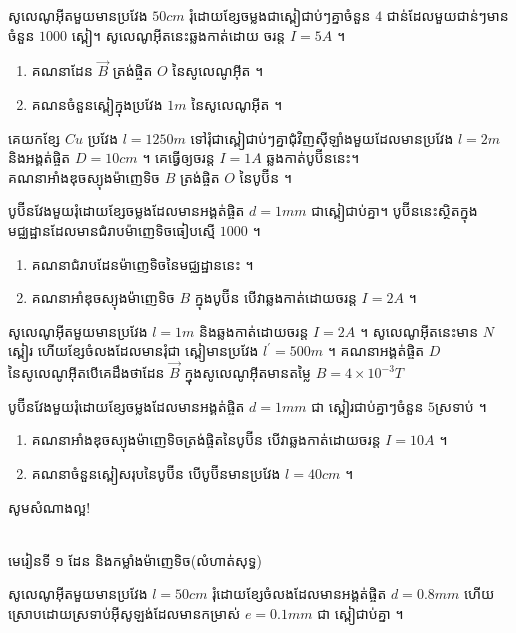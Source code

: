 \documentclass[12pt, a4paper]{article}
\begin{document}
\begin{enumerate}[m]
\begin{enumerate}[k]
	\end{enumerate}
	\item សូលេណូអ៊ីតមួយមានប្រវែង $50cm$ រំុដោយខ្សែចម្លងជាស្ពៀជាប់ៗគ្នាចំនួន $4$ ជាន់ដែលមួយជាន់ៗមានចំនួន $1000$ ស្ពៀ។ សូលេណូអ៊ីតនេះឆ្លងកាត់ដោយ ចរន្ត $I=5A$ ។ 
	\begin{enumerate}[k]
		\item គណនាដែន $\vec{B}$ ត្រង់ផ្ចិត $O$ នៃសូលេណូអ៊ីត ។
		\item គណនចំនួនស្ពៀក្នុងប្រវែង $1m$ នៃសូលេណូអ៊ីត ។
	\end{enumerate}
	\item គេយកខ្សែ $Cu$ ប្រវែង $l=1250m$ ទៅរុំជាស្ពៀជាប់ៗគ្នាជុំវិញស៊ីឡាំងមួយដែលមានប្រវែង $l=2m$ និងអង្គត់ផ្ចិត $D=10cm$ ។ គេធ្វើឲ្យចរន្ត $I=1A$ ឆ្លងកាត់បូប៊ីននេះ។\\
	គណនាអាំងឌុចស្យុងម៉ាញេទិច $B$ ត្រង់ផ្ចិត $O$ នៃបូប៊ីន ។
	\item បូប៊ីនវែងមួយរុំដោយខ្សែចម្លងដែលមានអង្គត់ផ្ចិត $d=1mm$ ជាស្ពៀជាប់គ្នា។ បូប៊ីននេះស្ថិតក្នុងមជ្ឈដ្ឋានដែលមានជំរាបម៉ាញេទិចធៀបស្មើ $1000$ ។
	\begin{enumerate}[k]
		\item គណនាជំរាបដែនម៉ាញេទិចនៃមជ្ឈដ្ឋាននេះ ។
		\item គណនាអាំឌុចស្យុងម៉ាញេទិច $B$ ក្នុងបូប៊ីន បើវាឆ្លងកាត់ដោយចរន្ត $I=2A$ ។
	\end{enumerate}
	\item សូលេណូអ៊ីតមួយមានប្រវែង $l=1m$ និងឆ្លងកាត់ដោយចរន្ត $I=2A$ ។ សូលេណូអ៊ីតនេះមាន $N$ ស្ពៀរ ហើយខ្សែចំលងដែលមានរុំជា ស្ពៀមានប្រវែង $l^{'}=500m$ ។ គណនាអង្គត់ផ្ចិត $D$ នៃសូលេណូអ៊ីតបើគេដឹងថាដែន $\vec{B}$ ក្នុងសូលេណូអ៊ីតមានតម្លៃ $B=4\times10^{-3}T$
	\item បូប៊ីនវែងមួយរុំដោយខ្សែចម្លងដែលមានអង្គត់ផ្ចិត $d=1mm$ ជា ស្ពៀរជាប់គ្នាៗចំនួន $5$ស្រទាប់ ។
	\begin{enumerate}[k]
		\item គណនាអាំងឌុចស្យុងម៉ាញេទិចត្រង់ផ្ចិតនៃបូប៊ីន បើវាឆ្លងកាត់ដោយចរន្ត $I=10A$ ។
		\item គណនាចំនួនស្ពៀសរុបនៃបូប៊ីន បើបូប៊ីនមានប្រវែង $l=40cm$ ។
	\end{enumerate}
	\begin{center}
		\sffamily\color{black}
		សូមសំណាងល្អ!
	\end{center}\newpage
	\begin{center}
		\sffamily\color{black}
		\\
		មេរៀនទី​ ១ ដែន និងកម្លាំងម៉ាញេទិច(លំហាត់សុទ្ធ)
	\end{center}
	\begin{minipage}{0.60\textwidth}
	\item សូលេណូអ៊ីតមួយមានប្រវែង $l=50cm$ រុំដោយខ្សែចំលងដែលមានអង្គត់ផ្ចិត $d=0.8mm$ ហើយស្រោបដោយស្រទាប់អ៊ីសូឡង់ដែលមានកម្រាស់ $e=0.1mm$ ជា ស្ពៀជាប់គ្នា ។ 

\end{minipage}
\end{enumerate}
\end{document}
